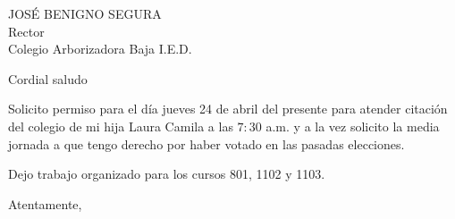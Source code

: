 \documentclass[letterpaper,spanish,11pt]{letter}
\begin{document}
\begin{letter}{JOSÉ BENIGNO SEGURA\\Rector\\Colegio Arborizadora Baja I.E.D.}
	
\opening{Cordial saludo}
Solicito permiso para el día jueves 24 de abril del presente para atender citación del colegio de mi hija Laura Camila a las $7:30$ a.m. y a la vez solicito la media jornada a que tengo derecho por haber votado en las pasadas elecciones.

Dejo trabajo organizado para los cursos 801, 1102 y 1103.
\closing{Atentamente,}


\end{letter}
\end{document}

